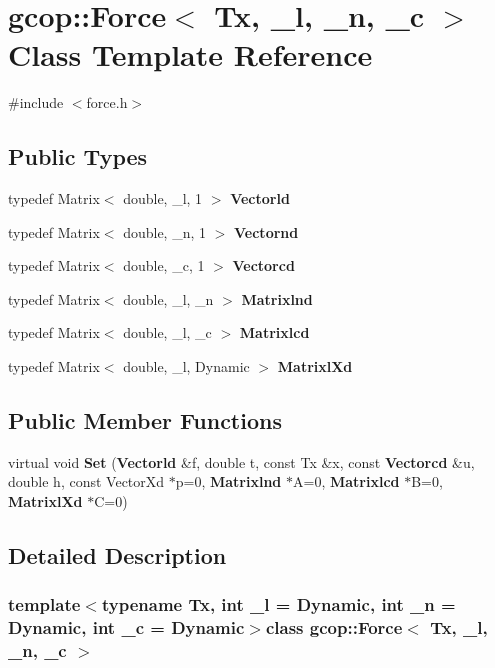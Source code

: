 \section{gcop\-:\-:\-Force$<$ \-Tx, \-\_\-l, \-\_\-n, \-\_\-c $>$ \-Class \-Template \-Reference}
\label{classgcop_1_1Force}


{\ttfamily \#include $<$force.\-h$>$}

\subsection*{\-Public \-Types}
\begin{DoxyCompactItemize}
\item 
typedef \-Matrix$<$ double, \-\_\-l, 1 $>$ {\bf \-Vectorld}
\item 
typedef \-Matrix$<$ double, \-\_\-n, 1 $>$ {\bf \-Vectornd}
\item 
typedef \-Matrix$<$ double, \-\_\-c, 1 $>$ {\bf \-Vectorcd}
\item 
typedef \-Matrix$<$ double, \-\_\-l, \-\_\-n $>$ {\bf \-Matrixlnd}
\item 
typedef \-Matrix$<$ double, \-\_\-l, \-\_\-c $>$ {\bf \-Matrixlcd}
\item 
typedef \-Matrix$<$ double, \-\_\-l, \*
\-Dynamic $>$ {\bf \-Matrixl\-Xd}
\end{DoxyCompactItemize}
\subsection*{\-Public \-Member \-Functions}
\begin{DoxyCompactItemize}
\item 
virtual void {\bf \-Set} ({\bf \-Vectorld} \&f, double t, const \-Tx \&x, const {\bf \-Vectorcd} \&u, double h, const \-Vector\-Xd $\ast$p=0, {\bf \-Matrixlnd} $\ast$\-A=0, {\bf \-Matrixlcd} $\ast$\-B=0, {\bf \-Matrixl\-Xd} $\ast$\-C=0)
\end{DoxyCompactItemize}


\subsection{\-Detailed \-Description}
\subsubsection*{template$<$typename \-Tx, int \-\_\-l = \-Dynamic, int \-\_\-n = \-Dynamic, int \-\_\-c = \-Dynamic$>$class gcop\-::\-Force$<$ Tx, \-\_\-l, \-\_\-n, \-\_\-c $>$}


